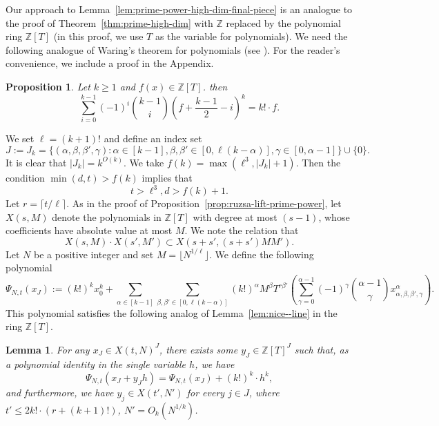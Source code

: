 \documentclass[12pt,reqno]{amsart}
\theoremstyle{plain}
\newtheorem{lemma}[theorem]{Lemma}
\newtheorem{proposition}[theorem]{Proposition}
\theoremstyle{definition}
\newcommand{\Z}{\mathbb{Z}}
\newcommand{\1}{\mathbf{1}}
\newcommand{\abs}[1]{\left|#1\right|}
\begin{document}
Our approach to Lemma~\ref{lem:prime-power-high-dim-final-piece} is an analogue to the proof of Theorem~\ref{thm:prime-high-dim} with $\Z$ replaced by the polynomial ring $\Z[T]$ (in this proof, we use $T$ as the variable for polynomials). We need the following analogue of Waring's theorem for polynomials (see \cite{CHWaring, Zhu}). For the reader's convenience, we include a proof in the Appendix.

\begin{proposition}\label{prop:shifted-kth-power-sum}
Let $k\ge 1$ and $f(x)\in \mathbb{Z}[T]$. then
\[
\sum_{i = 0}^{k - 1} (-1)^i \binom{k - 1}{i} \left(f + \frac{k-1}{2} - i\right)^k = k! \cdot f.
\]
\end{proposition}


We set $\ell = (k + 1)!$ and define an index set
$$J := J_k = \{(\alpha, \beta, \beta', \gamma): \alpha \in [k - 1], \beta, \beta' \in [0, \ell (k - \alpha)], \gamma \in [0, \alpha - 1]\} \cup \{0\}.$$
It is clear that $\abs{J_k} = k^{O(k)}$. We take $f(k) = \max(\ell^3, \abs{J_k} + 1)$. Then the condition $\min(d, t) > f(k)$ implies that
$$t > \ell^3, d > f(k) + 1.$$
Let $r = \lceil t / \ell \rceil$. As in the proof of Proposition~\ref{prop:ruzsa-lift-prime-power}, let $X(s, M)$ denote the polynomials in $\Z[T]$ with degree at most $(s - 1)$, whose coefficients have absolute value at most $M$. We note the relation that
\begin{equation}
    \label{eq:X-product}
 X(s, M) \cdot X(s', M') \subset X(s + s', (s + s') M M')   .
\end{equation}
Let $N$ be a positive integer and set $M = \lfloor N^{1 / \ell} \rfloor$.  We define the following polynomial
$$\Psi_{N,t}(x_J) := (k!)^{k} x_0^k + \sum_{\alpha \in [k - 1]}\sum_{\beta, \beta' \in [0, \ell (k - \alpha)]}(k!)^{\alpha} M^{\beta} T^{r \beta'} \left(\sum_{\gamma = 0}^{\alpha - 1} (-1)^{\gamma} \binom{\alpha - 1}{\gamma} x_{\alpha, \beta, \beta', \gamma}^{\alpha}\right).$$
This polynomial satisfies the following analog of Lemma~\ref{lem:nice--line} in the ring $\Z[T]$.
\begin{lemma}
    \label{lem:nice--line--poly}
    For any $x_J \in X(t, N)^J$, there exists some $y_J \in \Z[T]^J$ such that, as a polynomial identity in the single variable $h$, we have
    $$\Psi_{N,t}(x_J + y_J h) = \Psi_{N,t}(x_J) + (k!)^k \cdot h^k,$$
    and furthermore, we have $y_j \in X(t', N')$ for every $j \in J$, where $t' \leq 2k! \cdot (r + (k + 1)!)$, $N' = O_k(N^{1 / k})$.
\end{lemma}
\end{document}
